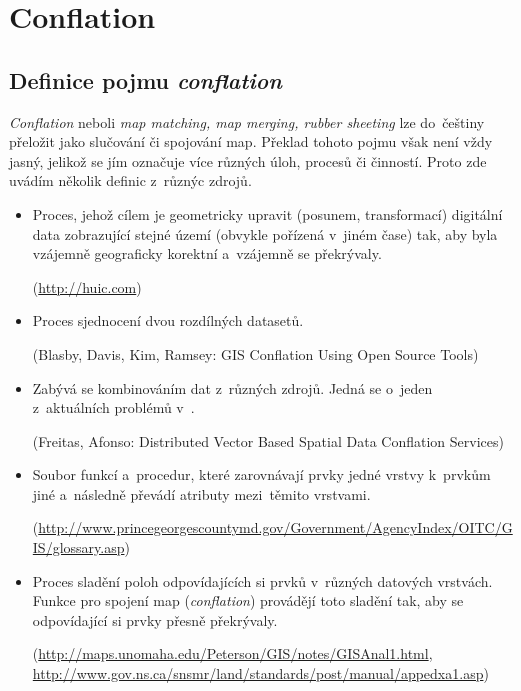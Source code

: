 \chapter{Conflation}
\label{2-conflation}

\section{Definice pojmu \textit{conflation}}
\label{definice}

\textit{Conflation} neboli \textit{map matching, map merging, rubber sheeting} 
lze do~češtiny přeložit jako slučování či spojování map. Překlad tohoto pojmu 
však není vždy jasný, jelikož se jím označuje více různých úloh, procesů či 
činností. Proto zde uvádím několik definic z~různýc zdrojů. 

\begin{itemize}
 \item Proces, jehož cílem je geometricky upravit (posunem, transformací) 
    digitální data zobrazující stejné území (obvykle pořízená v~jiném čase) 
    tak, aby byla vzájemně geograficky korektní a~vzájemně se překrývaly. %
    
    (\url{http://huic.com})

  \item Proces sjednocení dvou rozdílných datasetů.
    
    (Blasby, Davis, Kim, Ramsey: GIS Conflation Using Open Source Tools)

  \item Zabývá se kombinováním dat z~různých zdrojů. Jedná se o~jeden 
    z~aktuálních problémů v~.
   
    (Freitas, Afonso: Distributed Vector Based Spatial Data Conflation 
    Services)

  \item Soubor funkcí a~procedur, které zarovnávají prvky jedné  vrstvy
    k~prvkům jiné a~následně převádí atributy mezi~těmito vrstvami.
   
    (\url{http://www.princegeorgescountymd.gov/Government/AgencyIndex/OITC/GIS/glossary.asp})

  \item Proces sladění poloh odpovídajících si prvků v~různých datových 
    vrstvách. Funkce pro spojení map (\textit{conflation}) provádějí toto 
    sladění tak, aby se odpovídající si prvky přesně překrývaly. 
    
    (\url{http://maps.unomaha.edu/Peterson/GIS/notes/GISAnal1.html},
    \newline \url{http://www.gov.ns.ca/snsmr/land/standards/post/manual/appedxa1.asp})


\end{itemize}
